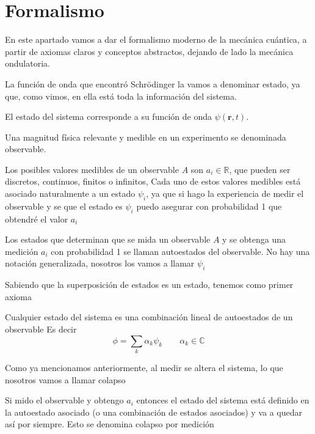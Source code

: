 \section{Formalismo}

En este apartado vamos a dar el formalismo moderno de la mecánica cuántica, a partir de axiomas claros y conceptos abstractos, dejando de lado la mecánica ondulatoria.

La función de onda que encontró Schrödinger la vamos a denominar estado, ya que, como vimos, en ella está toda la información del sistema.

\begin{definition}[Estado]
    El estado del sistema corresponde a su función de onda $\psi(\textbf{r},t)$.
\end{definition}

\begin{definition}[Observable]
    Una magnitud física relevante y medible en un experimento se denominada observable.
\end{definition}

Los posibles valores medibles de un observable $A$ son $a_i \in \mathbb{R}$, que pueden ser discretos, continuos, finitos o infinitos,
Cada uno de estos valores medibles está asociado naturalmente a un estado $\psi_i$, ya que si hago la experiencia de medir el observable y se que el estado es $\psi_i$ puedo asegurar con probabilidad 1 que obtendré el valor $a_i$
\begin{definition}
    Los estados que determinan que se mida un observable $A$ y se obtenga una medición $a_i$ con probabilidad 1 se llaman autoestados del observable. 
    No hay una notación generalizada, nosotros los vamos a llamar $\psi_i$
\end{definition}

Sabiendo que la superposición de estados es un estado, tenemos como primer axioma
\begin{axiom}
    Cualquier estado del sistema es una combinación lineal de autoestados de un observable
    Es decir
    \begin{equation}
        \phi = \sum_k \alpha_k \psi_k \qquad \alpha_k \in \mathbb{C}
    \end{equation}
\end{axiom}

Como ya mencionamos anteriormente, al medir se altera el sistema, lo que nosotros vamos a llamar colapso
\begin{axiom}
    Si mido el observable y obtengo $a_i$ entonces el estado del sistema está definido en la autoestado asociado (o una combinación de estados asociados) y va a quedar así por siempre.
    Esto se denomina colapso por medición
\end{axiom}

